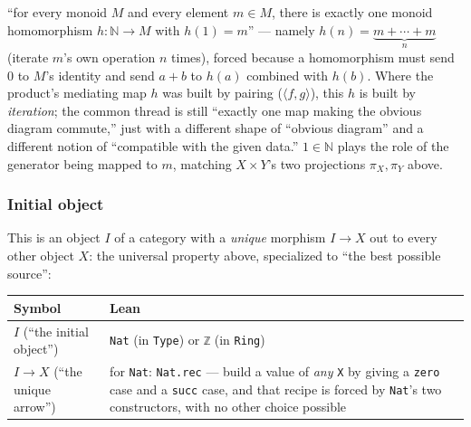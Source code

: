 \begin{center}

\end{center}

``for every monoid \(M\) and every element \(m \in M\), there is exactly one monoid homomorphism \(h : \mathbb{N} \to M\) with \(h(1) = m\)'' --- namely \(h(n) = \underbrace{m + \cdots + m}_{n}\) (iterate \(m\)'s own operation \(n\) times), forced because a homomorphism must send \(0\) to \(M\)'s identity and send \(a+b\) to \(h(a)\) combined with \(h(b)\). Where the product's mediating map \(h\) was built by pairing (\(\langle f, g\rangle\)), this \(h\) is built by \emph{iteration}; the common thread is still ``exactly one map making the obvious diagram commute,'' just with a different shape of ``obvious diagram'' and a different notion of ``compatible with the given data.'' \(1 \in \mathbb{N}\) plays the role of the generator being mapped to \(m\), matching \(X\times Y\)'s two projections \(\pi_X,\pi_Y\) above.

\subsubsection{Initial object}\label{sec:01-basics:04-terminology:9}

This is an object \(I\) of a category with a \emph{unique} morphism \(I \to X\) out to every other object \(X\): the universal property above, specialized to ``the best possible source'':

\begin{center}

\end{center}

{\small\begin{tabular}{
  >{\raggedright\arraybackslash}p{}
  >{\raggedright\arraybackslash}p{}
}
\toprule
Symbol & Lean \\
\midrule
\(I\) (``the initial object'') & \texttt{Nat} (in \texttt{Type}) or \texttt{ℤ} (in \texttt{Ring}) \\
\(I \to X\) (``the unique arrow'') & for \texttt{Nat}: \texttt{Nat.rec} --- build a value of \emph{any} \texttt{X} by giving a \texttt{zero} case and a \texttt{succ} case, and that recipe is forced by \texttt{Nat}'s two constructors, with no other choice possible \\
\bottomrule
\end{tabular}}


